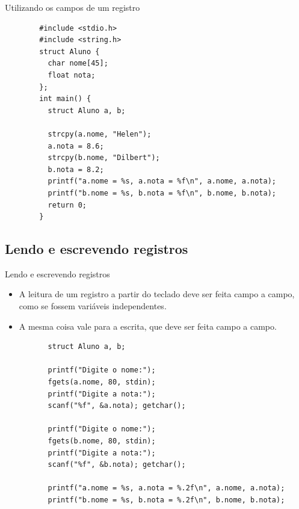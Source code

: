 \documentclass[handout]{beamer}
\begin{document}
\begin{frame}[fragile]{Utilizando os campos de um registro}

    \begin{verbatim}
        #include <stdio.h>
        #include <string.h>
        struct Aluno {
          char nome[45];
          float nota;
        };
        int main() {
          struct Aluno a, b;

          strcpy(a.nome, "Helen");
          a.nota = 8.6;
          strcpy(b.nome, "Dilbert");
          b.nota = 8.2;
          printf("a.nome = %s, a.nota = %f\n", a.nome, a.nota);
          printf("b.nome = %s, b.nota = %f\n", b.nome, b.nota);
          return 0;
        }
    \end{verbatim}

\end{frame}


\subsection{Lendo e escrevendo registros}

\begin{frame}[fragile]{Lendo e escrevendo registros}

    \begin{itemize}
        \item A leitura de um registro a partir do teclado
        deve ser feita campo a campo, como se fossem variáveis
        independentes.
        \item A mesma coisa vale para a escrita, que deve ser feita
        campo a campo.
    \end{itemize}

    \vspace{-1em}
    \begin{verbatim}
          struct Aluno a, b;

          printf("Digite o nome:");
          fgets(a.nome, 80, stdin);
          printf("Digite a nota:");
          scanf("%f", &a.nota); getchar();

          printf("Digite o nome:");
          fgets(b.nome, 80, stdin);
          printf("Digite a nota:");
          scanf("%f", &b.nota); getchar();

          printf("a.nome = %s, a.nota = %.2f\n", a.nome, a.nota);
          printf("b.nome = %s, b.nota = %.2f\n", b.nome, b.nota);
    \end{verbatim}

\end{frame}
\end{document}
